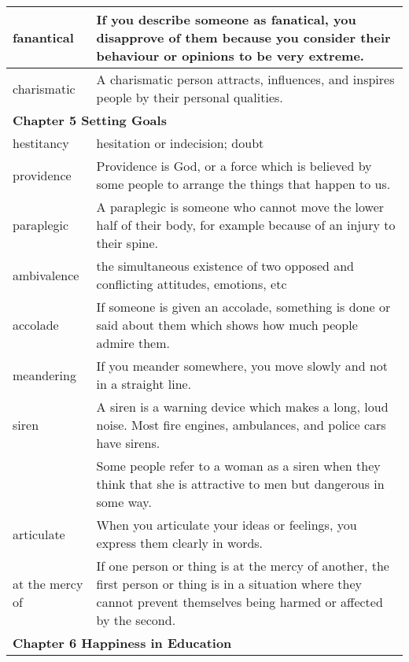 \documentclass{article}
\begin{document}
\begin{center}
\begin{longtable}{|l|p{9cm}|}
\hline
fanantical
&
If you describe someone as fanatical, you disapprove of them because you consider their behaviour or opinions to be very extreme.
\\

\hline
charismatic
&
A charismatic person attracts, influences, and inspires people by their personal qualities.
\\

\hline
\multicolumn{2}{|l|}{\textbf{Chapter 5 Setting Goals}}\\
\hline
hestitancy
&
hesitation or indecision; doubt
\\

\hline
providence
&
Providence is God, or a force which is believed by some people to arrange the things that happen to us.
\\

\hline
paraplegic
&
A paraplegic is someone who cannot move the lower half of their body, for example because of an injury to their spine.
\\

\hline
ambivalence
&
the simultaneous existence of two opposed and conflicting attitudes, emotions, etc
\\

\hline
accolade
&
If someone is given an accolade, something is done or said about them which shows how much people admire them.
\\

\hline
meandering
&
If you meander somewhere, you move slowly and not in a straight line.
\\

\hline
siren
&
A siren is a warning device which makes a long, loud noise. Most fire engines, ambulances, and police cars have sirens.
\\

&
Some people refer to a woman as a siren when they think that she is attractive to men but dangerous in some way.
\\

\hline
articulate
&
When you articulate your ideas or feelings, you express them clearly in words.
\\

\hline
at the mercy of
&
If one person or thing is at the mercy of another, the first person or thing is in a situation where they cannot prevent themselves being harmed or affected by the second.
\\

\hline
\multicolumn{2}{|l|}{\textbf{Chapter 6 Happiness in Education}}
\\


\end{longtable}
\end{center}
\end{document}
